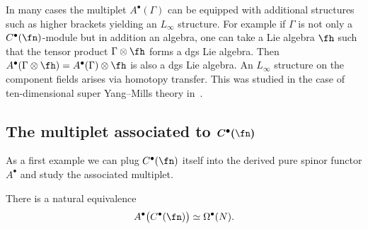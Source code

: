 \begin{rmk}
	In many cases the multiplet $A^\bullet(\Gamma)$ can be equipped with additional structures such as higher brackets yielding an $L_\infty$ structure. For example if $\Gamma$ is not only a $C^\bullet(\fn)$-module but in addition an algebra, one can take a Lie algebra $\fh$ such that the tensor product $\Gamma \otimes \fh$ forms a dgs Lie algebra. Then $A^\bullet(\Gamma \otimes \fh) = A^\bullet(\Gamma) \otimes \fh$ is also a dgs Lie algebra. An $L_\infty$ structure on the component fields arises via homotopy transfer. This was studied in the case of ten-dimensional super Yang--Mills theory in~\cite{AKLL, perspectives}.
\end{rmk}

\subsection[The multiplet associated to C\^{}bullet(n)]{The multiplet associated to $\boldsymbol{C^\bullet(\fn)}$} \label{sec: forms}

As a first example we can plug $C^\bullet(\fn)$ itself into the derived pure spinor functor $A^\bullet$ and study the associated multiplet.

\begin{lem}
	There is a natural equivalence
	\begin{equation*}
	A^\bullet\big(C^\bullet(\fn)\big) \simeq \Omega^\bullet(N).
	\end{equation*}
	
\end{lem}

